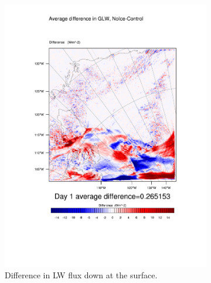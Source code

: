 \begin{figure}
	\begin{subfigure}{0.48\textwidth}
		\centering
		\includegraphics[width=\textwidth]{results/noice/diff_NoIce_GLW_Day1.pdf}
		\caption{Difference in LW flux down at the surface.}
		\label{subfig:glw_r2Day1}
	\end{subfigure}
	\quad
	\begin{subfigure}{0.48\textwidth}
		\centering

\end{subfigure}
\end{figure}
